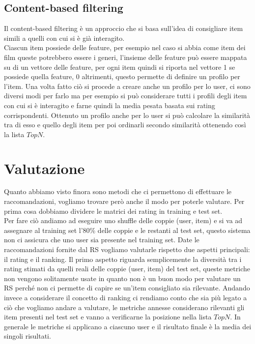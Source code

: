 \subsection{Content-based filtering}
Il content-based filtering è un approccio che si basa sull'idea di consigliare item simili a quelli con cui si è già interagito.\\
Ciascun item possiede delle feature, per esempio nel caso si abbia come item dei film queste potrebbero essere i generi, l'insieme delle feature può essere mappata su di un vettore delle feature, per ogni item quindi si riporta nel vettore 1 se possiede quella feature, 0 altrimenti, questo permette di definire un profilo per l'item.
Una volta fatto ciò si procede a creare anche un profilo per lo user, ci sono diversi modi per farlo ma per esempio si può considerare tutti i profili degli item con cui si è interagito e farne quindi la media pesata basata sui rating corrispondenti.
Ottenuto un profilo anche per lo user si può calcolare la similarità tra di esso e quello degli item per poi ordinarli secondo similarità ottenendo così la lista $TopN$.

\section{Valutazione}
Quanto abbiamo visto finora sono metodi che ci permettono di effettuare le raccomandazioni, vogliamo trovare però anche il modo per poterle valutare. Per prima cosa dobbiamo dividere le matrici dei rating in training e test set.\\
Per fare ciò andiamo ad eseguire uno shuffle delle coppie (user, item) e si va ad assegnare al training set l'80\% delle coppie e le restanti al test set, questo sistema non ci assicura che uno user sia presente nel training set.
Date le raccomandazioni fornite dal RS vogliamo valutarle rispetto due aspetti principali: il rating e il ranking.
Il primo aspetto riguarda semplicemente la diversità tra i rating stimati da quelli reali delle coppie (user, item) del test set, queste metriche non vengono solitamente usate in quanto non è un buon modo per valutare un RS perché non ci permette di capire se un'item consigliato sia rilevante.
Andando invece a considerare il concetto di ranking ci rendiamo conto che sia più legato a ciò che vogliamo andare a valutare, le metriche annesse considerano rilevanti gli item presenti nel test set e vanno a verificarne la posizione nella lista $TopN$.
In generale le metriche si applicano a ciascuno user e il risultato finale è la media dei singoli risultati.

